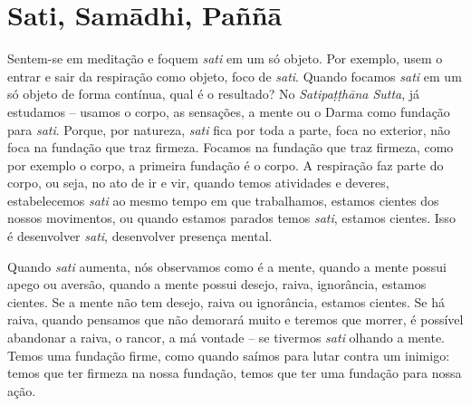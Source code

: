 
\chapter{Sati, Samādhi, Paññā}
\markright{\theChapterAuthor}

Sentem-se em meditação e foquem \textit{sati} em um só objeto. Por
exemplo, usem o entrar e sair da respiração como objeto, foco de
\textit{sati}. Quando focamos \textit{sati} em um só objeto de forma
contínua, qual é o resultado? No \textit{Satipaṭṭhāna Sutta}, já
estudamos – usamos o corpo, as sensações, a mente ou o Darma como
fundação para \textit{sati}. Porque, por natureza, \textit{sati} fica
por toda a parte, foca no exterior, não foca na fundação que traz
firmeza. Focamos na fundação que traz firmeza, como por exemplo o
corpo, a primeira fundação é o corpo. A respiração faz parte do corpo,
ou seja, no ato de ir e vir, quando temos atividades e deveres,
estabelecemos \textit{sati} ao mesmo tempo em que trabalhamos, estamos
cientes dos nossos movimentos, ou quando estamos parados temos
\textit{sati}, estamos cientes. Isso é desenvolver \textit{sati},
desenvolver presença mental. 

Quando \textit{sati} aumenta, nós observamos como é a mente, quando
a mente possui apego ou aversão, quando a mente possui desejo, raiva,
ignorância, estamos cientes. Se a mente não tem desejo, raiva ou
ignorância, estamos cientes. Se há raiva, quando pensamos que não
demorará muito e teremos que morrer, é possível abandonar a raiva, o
rancor, a má vontade – se tivermos \textit{sati} olhando a mente. Temos
uma fundação firme, como quando saímos para lutar contra um inimigo:
temos que ter firmeza na nossa fundação, temos que ter uma fundação
para nossa ação. 

